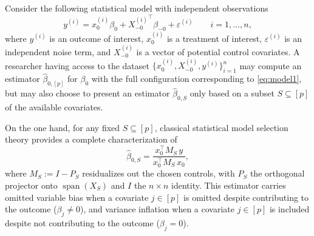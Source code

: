 Consider the following statistical model with independent observations 
\begin{equation}\label{eq:model1}
        y^{(i)} = x^{(i)}_0 \beta_0 + {X^{(i)}_{-0}}^\top \beta_{-0} + \varepsilon^{(i)} \qquad i = 1, \dots, n,
\end{equation}
where $y^{(i)}$ is an outcome of interest, $x^{(i)}_0$ is a treatment of interest, $\varepsilon^{(i)}$ is 
an independent noise term, and $X^{(i)}_{-0}$ is a vector of potential control covariates. A researcher having access
to the dataset $\{x^{(i)}_0, {X^{(i)}_{-0}}, y^{(i)}\}_{i = 1}^n$ may compute an estimator $\hat \beta_{0, [p]}$ for $\beta_0$  
with the full configuration corresponding to \eqref{eq:model1}, but may also choose to present an estimator $\hat \beta_{0, S}$ only based on a subset $S \subseteq [p]$ of the available covariates.

On the one hand, for any fixed $S \subseteq [p]$, classical statistical model selection theory provides a complete characterization of 
\begin{equation}
        \hat \beta_{0, S} = \frac{x_0^\top M_S\, y}{x_0^\top M_S\, x_0},
\end{equation}
where $M_S := I - P_S$ residualizes out the chosen controls, with $P_S$ the orthogonal projector onto $\operatorname{span}(X_S)$ and $I$ the $n \times n$ identity. This estimator carries omitted variable bias when a covariate $j \in [p]$ is omitted despite contributing to the outcome ($\beta_j \neq 0$), and variance inflation when a covariate $j \in [p]$ is included despite not contributing to the outcome ($\beta_j = 0$). 

